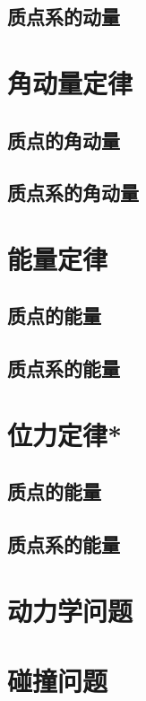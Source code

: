 \subsection{质点系的动量}


\section{角动量定律}

\subsection{质点的角动量}

\subsection{质点系的角动量}


\section{能量定律}

\subsection{质点的能量}

\subsection{质点系的能量}


\section{位力定律*}

\subsection{质点的能量}

\subsection{质点系的能量}



\section{动力学问题}

\section{碰撞问题}

